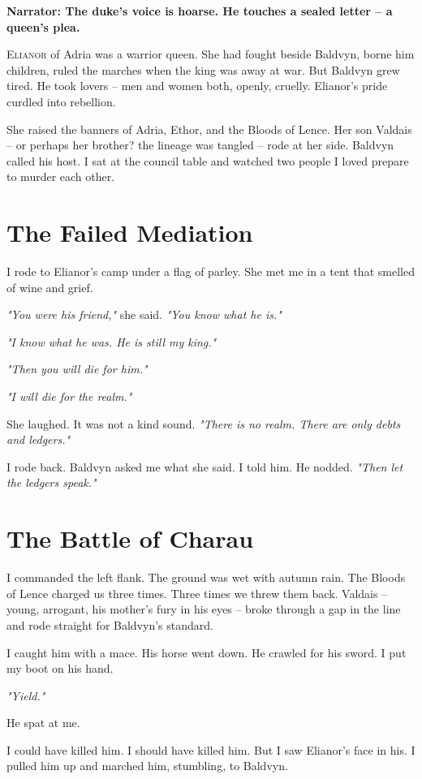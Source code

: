 \documentclass[11pt]{book}
\begin{document}
\textbf{Narrator: The duke's voice is hoarse. He touches a sealed letter -- a queen's plea.}

\lettrine{E}{lianor} of Adria was a warrior queen. She had fought beside Baldvyn, borne him children, ruled the marches when the king was away at war. But Baldvyn grew tired. He took lovers -- men and women both, openly, cruelly. Elianor's pride curdled into rebellion.

She raised the banners of Adria, Ethor, and the Bloods of Lence. Her son Valdais -- or perhaps her brother? the lineage was tangled -- rode at her side. Baldvyn called his host. I sat at the council table and watched two people I loved prepare to murder each other.

\section*{The Failed Mediation}
I rode to Elianor's camp under a flag of parley. She met me in a tent that smelled of wine and grief.

\emph{"You were his friend,"} she said. \emph{"You know what he is."}

\emph{"I know what he was. He is still my king."}

\emph{"Then you will die for him."}

\emph{"I will die for the realm."}

She laughed. It was not a kind sound. \emph{"There is no realm. There are only debts and ledgers."}

I rode back. Baldvyn asked me what she said. I told him. He nodded. \emph{"Then let the ledgers speak."}

\section*{The Battle of Charau}
I commanded the left flank. The ground was wet with autumn rain. The Bloods of Lence charged us three times. Three times we threw them back. Valdais -- young, arrogant, his mother's fury in his eyes -- broke through a gap in the line and rode straight for Baldvyn's standard.

I caught him with a mace. His horse went down. He crawled for his sword. I put my boot on his hand.

\emph{"Yield."}

He spat at me.

I could have killed him. I should have killed him. But I saw Elianor's face in his. I pulled him up and marched him, stumbling, to Baldvyn.
\end{document}
